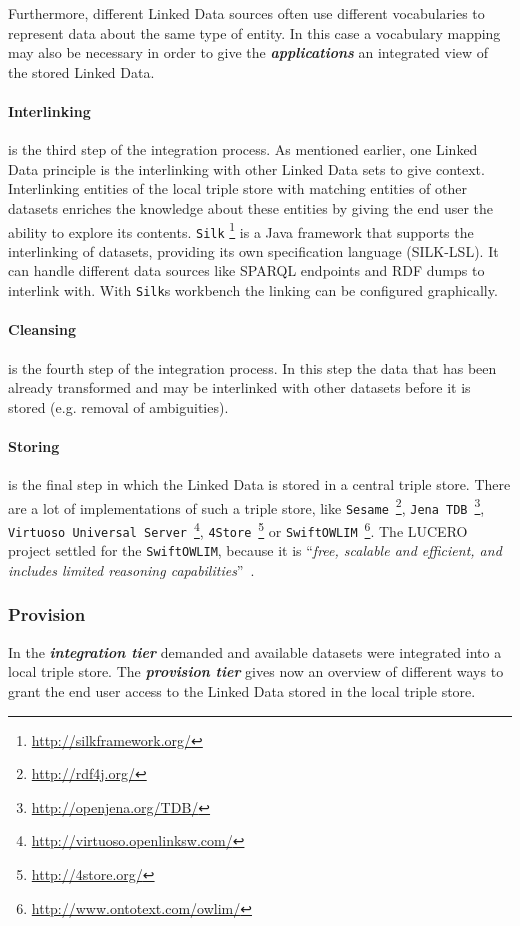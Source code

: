 \documentclass{article}
\begin{document}
Furthermore, different Linked Data sources often use different vocabularies to represent data about the same type of entity.\cite{berners-lee_fractal_2008} In this case a vocabulary mapping may also be necessary in order to give the \textit{\textbf{applications}} an integrated view of the stored Linked Data. 

\paragraph{Interlinking} is the third step of the integration process. As mentioned earlier, one Linked Data principle is the interlinking with other Linked Data sets to give context. Interlinking entities of the local triple store with matching entities of other datasets enriches the knowledge about these entities by giving the end user the ability to explore its contents. \texttt{Silk} \footnote{\url{http://silkframework.org/}} is a Java framework that supports the interlinking of datasets, providing its own specification language (SILK-LSL). It can handle different data sources like SPARQL endpoints and RDF dumps to interlink with. With \texttt{Silk}s workbench the linking can be configured graphically.

\paragraph{Cleansing} is the fourth step of the integration process. In this step the data that has been already transformed and may be interlinked with other datasets before it is stored (e.g. removal of ambiguities).

\paragraph{Storing} is the final step in which the Linked Data is stored in a central triple store. There are a lot of implementations of such a triple store, like 
\texttt{Sesame}~\footnote{\url{http://rdf4j.org/}}, 
\texttt{Jena TDB}~\footnote{\url{http://openjena.org/TDB/}},
\texttt{Virtuoso Universal Server}~\footnote{\url{http://virtuoso.openlinksw.com/}},
\texttt{4Store}~\footnote{\url{http://4store.org/}} or 
\texttt{SwiftOWLIM}~\footnote{\url{http://www.ontotext.com/owlim/}}. The LUCERO project settled for the \texttt{SwiftOWLIM}, because it is ``\textit{free, scalable and efficient, and includes limited reasoning capabilities}''~\cite{url:lucero-tabloid}.

\subsubsection{Provision}
\label{technical-architecture-challenges:proposal:provision}
In the \textit{\textbf{integration tier}} demanded and available datasets were integrated into a local triple store. The \textit{\textbf{provision tier}} gives now an overview of different ways to grant the end user access to the Linked Data stored in the local triple store.
\end{document}
